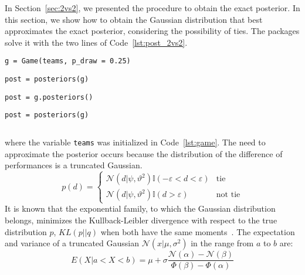 \documentclass[article]{jss}
\newcommand{\N}{\mathcal{N}}
\begin{document}
In Section~\ref{sec:2vs2}, we presented the procedure to obtain the exact posterior. 
In this section, we show how to obtain the Gaussian distribution that best approximates the exact posterior, considering the possibility of ties. 
The packages solve it with the two lines of Code~\ref{lst:post_2vs2}. 
%
\begin{lstlisting}[backgroundcolor=\color{all},belowskip=-0.77 \baselineskip]
g = Game(teams, p_draw = 0.25)
\end{lstlisting}  
\begin{paracol}{3}
\begin{lstlisting}[backgroundcolor=\color{julia!60}, belowskip=0cm]
post = posteriors(g)
\end{lstlisting}
\switchcolumn
\begin{lstlisting}[backgroundcolor=\color{python!60}, belowskip=0cm]
post = g.posteriors()
\end{lstlisting}
\switchcolumn
\begin{lstlisting}[backgroundcolor=\color{r!50}, belowskip=0cm]
post = posteriors(g)
\end{lstlisting}
\end{paracol}
\begin{lstlisting}[captionpos=b,backgroundcolor=\color{white}, label=lst:post_2vs2, caption={Computing the approximate posterior.}, belowskip=0cm, aboveskip=0cm]
\end{lstlisting}
%
where the variable \texttt{teams} was initialized in Code~\ref{lst:game}. 
The need to approximate the posterior occurs because the distribution of the difference of performances is a truncated Gaussian. 
%
\begin{equation}\label{eq:p_d}
p(d) =
\begin{cases}
\N(d|\psi,\vartheta^2) \mathbb{I}(-\varepsilon < d < \varepsilon) & \text{tie} \\
\N(d|\psi,\vartheta^2) \mathbb{I}(d > \varepsilon) & \text{not tie}
\end{cases}
\end{equation}
%
It is known that the exponential family, to which the Gaussian distribution belongs, minimizes the Kullback-Leibler divergence with respect to the true distribution $p$, $KL(p||q)$ when both have the same moments~\citep{Minka2005}. 
The expectation and variance of a truncated Gaussian $\N(x|\mu,\sigma^2)$ in the range from $a$ to $b$ are:
%
\begin{equation}\label{eq:mean_aprox_double}
 E(X| a < X < b) = \mu + \sigma \frac{\N(\alpha) - \N(\beta) }{\Phi(\beta) - \Phi(\alpha) }
\end{equation}
\end{document}
